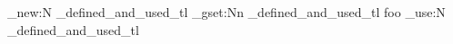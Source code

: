 \tl_new:N
  \g_defined_and_used_tl
\tl_gset:Nn
  \g_defined_and_used_tl
  { foo }
\tl_use:N
  \g_defined_and_used_tl
